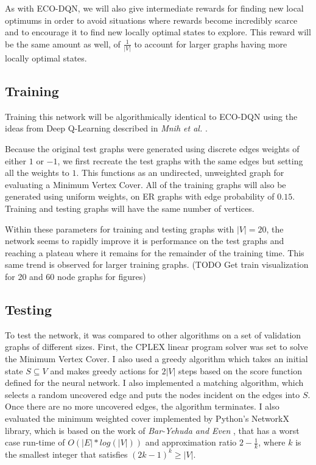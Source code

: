 \documentclass{article}
\begin{document}
As with ECO-DQN, we will also give intermediate rewards for finding new local optimums in order to avoid situations where rewards become incredibly scarce and to encourage it to find new locally optimal states to explore. This reward will be the same amount as well, of $\frac{1}{|V|}$ to account for larger graphs having more locally optimal states.

\subsection{Training}\label{sec:training-mvc}

Training this network will be algorithmically identical to ECO-DQN \cite{eco-dqn} using the ideas from Deep Q-Learning described in \textit{Mnih et al.} \cite{deepmind_2015}.

Because the original test graphs were generated using discrete edges weights of either $1$ or $-1$, we first recreate the test graphs with the same edges but setting all the weights to $1$. This functions as an undirected, unweighted graph for evaluating a Minimum Vertex Cover. All of the training graphs will also be generated using uniform weights, on ER graphs with edge probability of $0.15$. Training and testing graphs will have the same number of vertices.

Within these parameters for training and testing graphs with $|V| = 20$, the network seems to rapidly improve it is performance on the test graphs and reaching a plateau where it remains for the remainder of the training time. This same trend is observed for larger training graphs. (TODO Get train visualization for 20 and 60 node graphs for figures)%


\subsection{Testing}\label{sec:testing-mvc}

To test the network, it was compared to other algorithms on a set of validation graphs of different sizes. First, the CPLEX linear program solver was set to solve the Minimum Vertex Cover. I also used a greedy algorithm which takes an initial state $S \subseteq V$ and makes greedy actions for $2|V|$ steps based on the score function defined for the neural network. I also implemented a matching algorithm, which selects a random uncovered edge and puts the nodes incident on the edges into $S$. Once there are no more uncovered edges, the algorithm terminates. I also evaluated the minimum weighted cover implemented by Python's NetworkX library, which is based on the work of \textit{Bar-Yehuda and Even} \cite{min-weighted-cover-bar}, that has a worst case run-time of $O(|E| * log(|V|))$ and approximation ratio $2 - \frac{1}{k}$, where $k$ is the smallest integer that satisfies $(2k - 1)^k \ge |V|$. 
\end{document}
